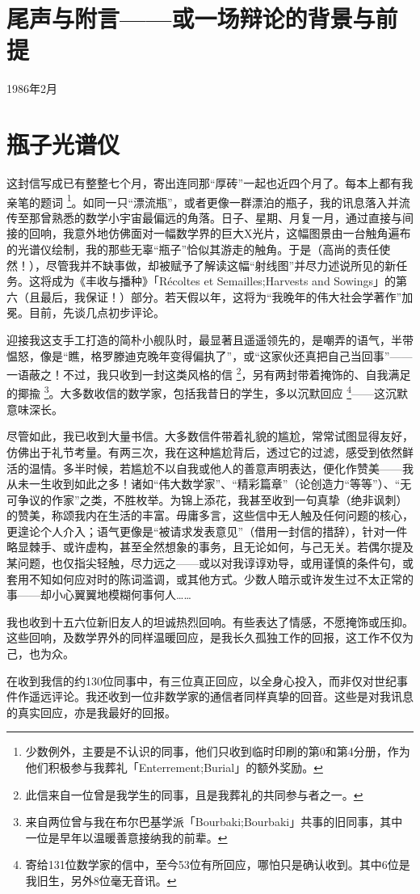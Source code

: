 \section*{尾声与附言——或一场辩论的背景与前提}

\hfill 1986年2月

\section{瓶子光谱仪}

这封信写成已有整整七个月，寄出连同那“厚砖”一起也近四个月了。每本上都有我亲笔的题词 \footnote{少数例外，主要是不认识的同事，他们只收到临时印刷的第0和第4分册，作为他们积极参与我葬礼「Enterrement;Burial」的额外奖励。}。如同一只“漂流瓶”，或者更像一群漂泊的瓶子，我的讯息落入并流传至那曾熟悉的数学小宇宙最偏远的角落。日子、星期、月复一月，通过直接与间接的回响，我意外地仿佛面对一幅数学界的巨大X光片，这幅图景由一台触角遍布的光谱仪绘制，我的那些无辜“瓶子”恰似其游走的触角。于是（高尚的责任使然！），尽管我并不缺事做，却被赋予了解读这幅“射线图”并尽力述说所见的新任务。这将成为《丰收与播种》「Récoltes et Semailles;Harvests and Sowings」的第六（且最后，我保证！）部分。若天假以年，这将为“我晚年的伟大社会学著作”加冕。目前，先谈几点初步评论。

迎接我这支手工打造的简朴小舰队时，最显著且遥遥领先的，是嘲弄的语气，半带愠怒，像是“瞧，格罗滕迪克晚年变得偏执了”，或“这家伙还真把自己当回事”——一语蔽之！不过，我只收到一封这类风格的信 \footnote{此信来自一位曾是我学生的同事，且是我葬礼的共同参与者之一。}，另有两封带着掩饰的、自我满足的揶揄 \footnote{来自两位曾与我在布尔巴基学派「Bourbaki;Bourbaki」共事的旧同事，其中一位是早年以温暖善意接纳我的前辈。}。大多数收信的数学家，包括我昔日的学生，多以沉默回应 \footnote{寄给131位数学家的信中，至今53位有所回应，哪怕只是确认收到。其中6位是我旧生，另外8位毫无音讯。}——这沉默意味深长。

尽管如此，我已收到大量书信。大多数信件带着礼貌的尴尬，常常试图显得友好，仿佛出于礼节考量。有两三次，我在这种尴尬背后，透过它的过滤，感受到依然鲜活的温情。多半时候，若尴尬不以自我或他人的善意声明表达，便化作赞美——我从未一生收到如此之多！诸如“伟大数学家”、“精彩篇章”（论创造力“等等”）、“无可争议的作家”之类，不胜枚举。为锦上添花，我甚至收到一句真挚（绝非讽刺）的赞美，称颂我内在生活的丰富。毋庸多言，这些信中无人触及任何问题的核心，更遑论个人介入；语气更像是“被请求发表意见”（借用一封信的措辞），针对一件略显棘手、或许虚构，甚至全然想象的事务，且无论如何，与己无关。若偶尔提及某问题，也仅指尖轻触，尽力远之——或以对我谆谆劝导，或用谨慎的条件句，或套用不知如何应对时的陈词滥调，或其他方式。少数人暗示或许发生过不太正常的事——却小心翼翼地模糊何事何人……

我也收到十五六位新旧友人的坦诚热烈回响。有些表达了情感，不愿掩饰或压抑。这些回响，及数学界外的同样温暖回应，是我长久孤独工作的回报，这工作不仅为己，也为众。

在收到我信的约130位同事中，有三位真正回应，以全身心投入，而非仅对世纪事件作遥远评论。我还收到一位非数学家的通信者同样真挚的回音。这些是对我讯息的真实回应，亦是我最好的回报。